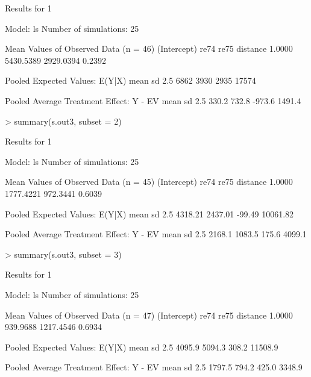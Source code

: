\begin{enumerate}
\begin{Schunk}
\begin{Soutput}
Results for 1 

  Model: ls 
  Number of simulations: 25 

Mean Values of Observed Data (n = 46) 
(Intercept)        re74        re75    distance 
     1.0000   5430.5389   2929.0394      0.2392 

Pooled Expected Values: E(Y|X)
 mean    sd  2.5% 97.5% 
 6862  3930  2935 17574 

Pooled Average Treatment Effect: Y - EV
  mean     sd   2.5%  97.5% 
 330.2  732.8 -973.6 1491.4 


\end{Soutput}
\begin{Sinput}
> summary(s.out3, subset = 2)
\end{Sinput}
\begin{Soutput}

Results for 1 

  Model: ls 
  Number of simulations: 25 

Mean Values of Observed Data (n = 45) 
(Intercept)        re74        re75    distance 
     1.0000   1777.4221    972.3441      0.6039 

Pooled Expected Values: E(Y|X)
    mean       sd     2.5%    97.5% 
 4318.21  2437.01   -99.49 10061.82 

Pooled Average Treatment Effect: Y - EV
  mean     sd   2.5%  97.5% 
2168.1 1083.5  175.6 4099.1 


\end{Soutput}
\begin{Sinput}
> summary(s.out3, subset = 3)
\end{Sinput}
\begin{Soutput}

Results for 1 

  Model: ls 
  Number of simulations: 25 

Mean Values of Observed Data (n = 47) 
(Intercept)        re74        re75    distance 
     1.0000    939.9688   1217.4546      0.6934 

Pooled Expected Values: E(Y|X)
   mean      sd    2.5%   97.5% 
 4095.9  5094.3   308.2 11508.9 

Pooled Average Treatment Effect: Y - EV
  mean     sd   2.5%  97.5% 
1797.5  794.2  425.0 3348.9 


\end{Soutput}
\end{Schunk}
  

\end{enumerate}
